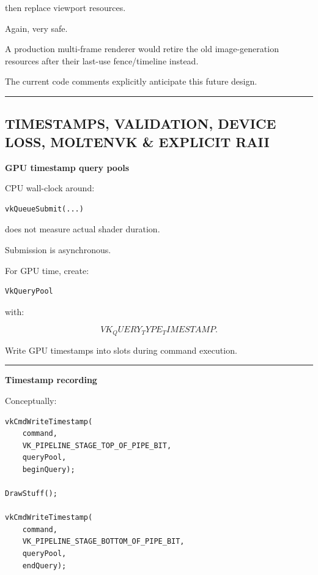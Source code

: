 then replace viewport resources.

Again, very safe.

A production multi-frame renderer would retire the old image-generation resources after their last-use fence/timeline instead.

The current code comments explicitly anticipate this future design.

\begin{center}\rule{0.5\linewidth}{0.5pt}\end{center}

\subsection{TIMESTAMPS, VALIDATION, DEVICE LOSS, MOLTENVK \& EXPLICIT RAII}\label{05-engine-i-ch022-timestamps-validation-device-loss-moltenvk-explicit-raii}

\textbf{GPU timestamp query pools}

CPU wall-clock around:

\begin{verbatim}
vkQueueSubmit(...)
\end{verbatim}

does not measure actual shader duration.

Submission is asynchronous.

For GPU time, create:

\begin{verbatim}
VkQueryPool
\end{verbatim}

with:

\[
VK_QUERY_TYPE_TIMESTAMP.
\]

Write GPU timestamps into slots during command execution.

\begin{center}\rule{0.5\linewidth}{0.5pt}\end{center}

\textbf{Timestamp recording}

Conceptually:

\begin{verbatim}
vkCmdWriteTimestamp(
    command,
    VK_PIPELINE_STAGE_TOP_OF_PIPE_BIT,
    queryPool,
    beginQuery);

DrawStuff();

vkCmdWriteTimestamp(
    command,
    VK_PIPELINE_STAGE_BOTTOM_OF_PIPE_BIT,
    queryPool,
    endQuery);
\end{verbatim}

